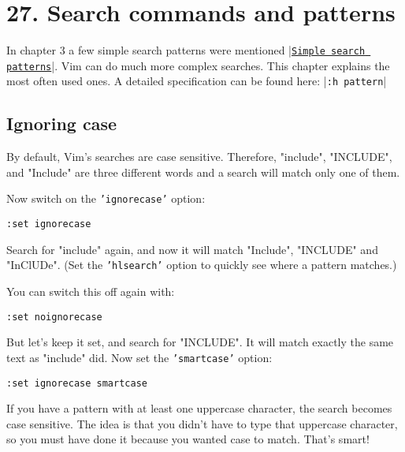 \section{27. Search commands and patterns}
\label{Search commands and patterns}
In chapter 3 a few simple search patterns were mentioned |\hyperref[Simple search patterns]{\texttt{Simple search patterns}}|.
Vim can do much more complex searches.
This chapter explains the most often used ones.
A detailed specification can be found here: |\texttt{:h pattern}|
\localtableofcontents
\subsection{Ignoring case}
By default, Vim's searches are case sensitive.
Therefore, "include", "INCLUDE", and "Include" are three different words and a search will match only one of them.

Now switch on the \texttt{'ignorecase'} option:

\begin{Verbatim}[samepage=true]
 :set ignorecase
\end{Verbatim}

Search for "include" again, and now it will match "Include", "INCLUDE" and "InClUDe".
(Set the \texttt{'hlsearch'} option to quickly see where a pattern matches.)

You can switch this off again with:

\begin{Verbatim}[samepage=true]
 :set noignorecase
\end{Verbatim}

But let's keep it set, and search for "INCLUDE".
It will match exactly the same text as "include" did.
Now set the \texttt{'smartcase'} option:

\begin{Verbatim}[samepage=true]
 :set ignorecase smartcase
\end{Verbatim}

If you have a pattern with at least one uppercase character, the search becomes case sensitive.
The idea is that you didn't have to type that uppercase character, so you must have done it because you wanted case to match.
That's smart!

